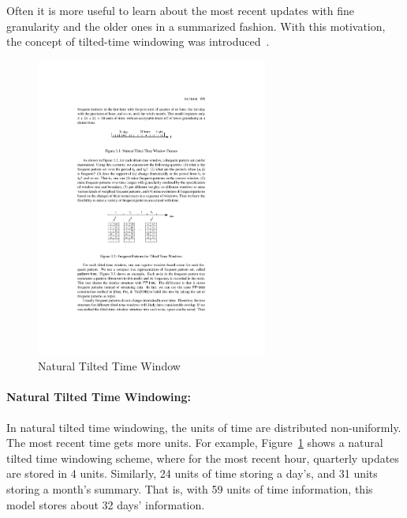 Often it is more useful to learn about the most recent updates with fine granularity and the older ones in a summarized fashion. With this motivation, the concept of tilted-time windowing was introduced~\cite{chen02:tiltedtime}.

\begin{figure}[htbp]
    \begin{center}
        \includegraphics[width=3.0in]{figs/naturaltime.pdf}
        \caption{Natural Tilted Time Window}
        \label{fig:bg:ntime}
    \end{center}
\end{figure}
\paragraph{Natural Tilted Time Windowing:} In natural tilted time windowing, the units of time are distributed non-uniformly. The most recent time gets more units. For example, Figure~\ref{fig:bg:ntime} shows a natural tilted time windowing scheme, where for the most recent hour, quarterly updates are stored in 4 units. Similarly, 24 units of time storing a day's, and 31 units storing a month's summary. That is, with 59 units of time information, this model stores about 32 days' information.

